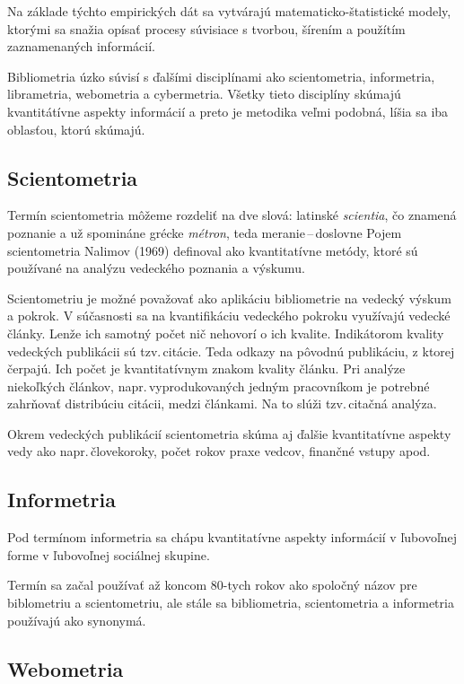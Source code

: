 Na základe týchto empirických dát sa vytvárajú matematicko-štatistické modely,
ktorými sa snažia opísať procesy súvisiace s tvorbou, šírením a použítím
zaznamenaných informácií.

Bibliometria úzko súvisí s ďalšími disciplínami ako scientometria, informetria,
librametria, webometria a cybermetria.  Všetky tieto disciplíny skúmajú
kvantitátívne aspekty informácií a preto je metodika veľmi podobná, líšia sa iba
oblasťou, ktorú skúmajú.


\subsection{Scientometria}

Termín scientometria môžeme rozdeliť na dve slová: latinské \emph{scientia}, čo
znamená poznanie a už spomináne grécke \emph{métron}, teda meranie\,--\,doslovne
 Pojem scientometria Nalimov (1969) definoval ako
kvantitatívne metódy, ktoré sú používané na analýzu vedeckého poznania a
výskumu.

Scientometriu je možné považovať ako aplikáciu bibliometrie na vedecký výskum a
pokrok.  V súčasnosti sa na kvantifikáciu vedeckého pokroku využívajú vedecké
články.  Lenže ich samotný počet nič nehovorí o ich kvalite.  Indikátorom
kvality vedeckých publikácii sú tzv.\,citácie.  Teda odkazy na pôvodnú
publikáciu, z ktorej čerpajú.  Ich počet je kvantitatívnym znakom kvality
článku.  Pri analýze niekoľkých článkov, napr.\,vyprodukovaných jedným
pracovníkom je potrebné zahrňovať distribúciu citácii, medzi článkami.  Na to
slúži tzv.\,citačná analýza.

Okrem vedeckých publikácií scientometria skúma aj ďalšie kvantitatívne aspekty
vedy ako napr.\,človekoroky, počet rokov praxe vedcov, finančné vstupy apod.
\citet{Bellis2009}


\subsection{Informetria}

Pod termínom informetria sa chápu kvantitatívne aspekty informácií v ľubovoľnej
forme v ľubovoľnej sociálnej skupine.

Termín sa začal používať až koncom 80-tych rokov ako spoločný názov pre
biblometriu a scientometriu, ale stále sa bibliometria, scientometria a
informetria používajú ako synonymá.


\subsection{Webometria}

